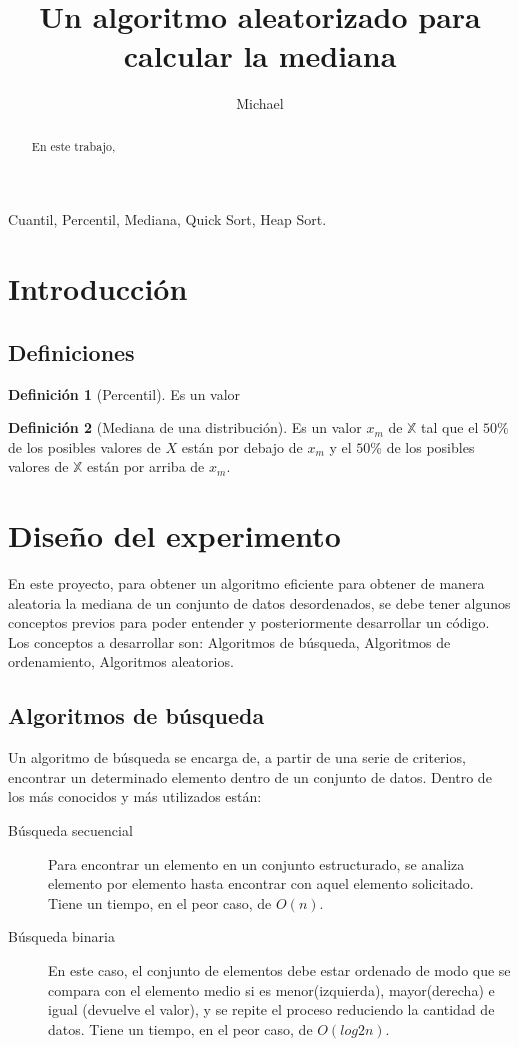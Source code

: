 \documentclass[9pt,draft,a4paper,twoside,onecolumn,romanappendices]{IEEEtran}\usepackage[]{graphicx}\usepackage[]{color}
\title{Un algoritmo aleatorizado para calcular la mediana}
\author{Michael \IEEEmembership{Member,~IEEE,\thanks{M}}}
\theoremstyle{definition}
\newtheorem{definition}{Definición}[subsection]
\begin{document}
\maketitle
\begin{abstract}
En este trabajo, 
\end{abstract}
\begin{IEEEkeywords}
Cuantil, Percentil, Mediana, Quick Sort, Heap Sort.
\end{IEEEkeywords}
\section{Introducción}

\subsection{Definiciones}

\begin{definition}[Percentil]
Es un valor
\end{definition}

\begin{definition}[Mediana de una distribución]
Es un valor $x_m$ de $\mathbb{X}$ tal que el $50\%$ de los posibles valores de $X$ están por debajo de $x_m$ y el $50\%$ de los posibles valores de $\mathbb{X}$ están por arriba de $x_m$.
\end{definition}

\section{Diseño del experimento}
En este proyecto, para obtener un algoritmo eficiente para obtener de manera aleatoria la mediana de un conjunto de datos desordenados, se debe tener algunos conceptos previos para poder entender y posteriormente desarrollar un código. Los conceptos a desarrollar son: Algoritmos de búsqueda, Algoritmos de ordenamiento, Algoritmos aleatorios.

\subsection{Algoritmos de búsqueda}
Un algoritmo de búsqueda se encarga de, a partir de una serie de criterios, encontrar un determinado elemento dentro de un conjunto de datos. Dentro de los más conocidos y más utilizados están:
\begin{description}
\item[Búsqueda secuencial] Para encontrar un elemento en un conjunto estructurado, se analiza elemento por elemento hasta encontrar con aquel elemento solicitado. Tiene un tiempo, en el peor caso, de $O(n)$.
\item[Búsqueda binaria] En este caso, el conjunto de elementos debe estar ordenado de modo que se compara con el elemento medio si es menor(izquierda), mayor(derecha) e igual (devuelve el valor), y se repite el proceso reduciendo la cantidad de datos. Tiene un tiempo, en el peor caso, de $O(log2n)$.
\end{description}
\end{document}
